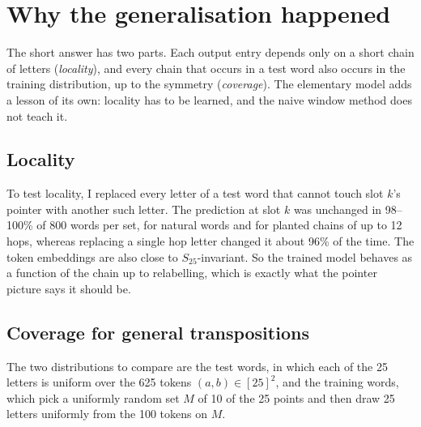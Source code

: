 \documentclass[11pt,a4paper]{article}
\begin{document}
\section{Why the generalisation happened}\label{sec:general}

The short answer has two parts. Each output entry depends only on a short chain of letters (\emph{locality}), and every chain that occurs in a test word also occurs in the training distribution, up to the symmetry (\emph{coverage}). The elementary model adds a lesson of its own: locality has to be learned, and the naive window method does not teach it.

\subsection{Locality}

To test locality, I replaced every letter of a test word that cannot touch slot $k$'s pointer with another such letter. The prediction at slot $k$ was unchanged in 98--100\% of 800 words per set, for natural words and for planted chains of up to 12 hops, whereas replacing a single hop letter changed it about 96\% of the time. The token embeddings are also close to $S_{25}$-invariant. So the trained model behaves as a function of the chain up to relabelling, which is exactly what the pointer picture says it should be.

\subsection{Coverage for general transpositions}

The two distributions to compare are the test words, in which each of the 25 letters is uniform over the 625 tokens $(a,b)\in[25]^2$, and the training words, which pick a uniformly random set $M$ of 10 of the 25 points and then draw 25 letters uniformly from the 100 tokens on $M$.
\end{document}
